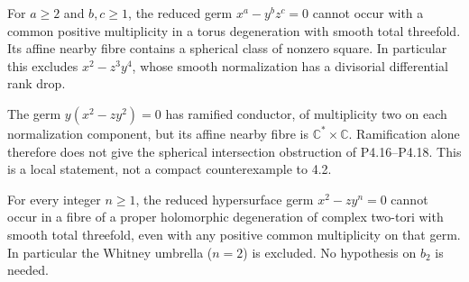 \begin{proposition}[P4.18]\hypertarget{tag-02WP}{}\label{night:P4.18}\label{stmt:P4.18}


For $a\geq2$ and $b,c\geq1$, the reduced germ
$x^a-y^bz^c=0$ cannot occur with a common positive multiplicity
in a torus degeneration with smooth total threefold. Its affine
nearby fibre contains a spherical class of nonzero square.
In particular this excludes $x^2-z^3y^4$, whose smooth
normalization has a divisorial differential rank drop.
\end{proposition}

\begin{proposition}[P4.19]\hypertarget{tag-02WQ}{}\label{night:P4.19}\label{stmt:P4.19}


The germ $y(x^2-zy^2)=0$ has ramified conductor, of multiplicity
two on each normalization component, but its affine nearby
fibre is $\mathbb C^*\times\mathbb C$. Ramification alone
therefore does not give the spherical intersection obstruction
of P4.16--P4.18. This is a local statement, not a compact
counterexample to 4.2.
\end{proposition}

\begin{proposition}[P4.16]\hypertarget{tag-02WN}{}\label{night:P4.16}\label{stmt:P4.16}


For every integer $n\geq1$, the reduced hypersurface germ
$x^2-zy^n=0$ cannot occur in a fibre of a proper holomorphic
degeneration of complex two-tori with smooth total threefold,
even with any positive common multiplicity on that germ.
In particular the Whitney umbrella ($n=2$) is excluded.
No hypothesis on $b_2$ is needed.
\end{proposition}

